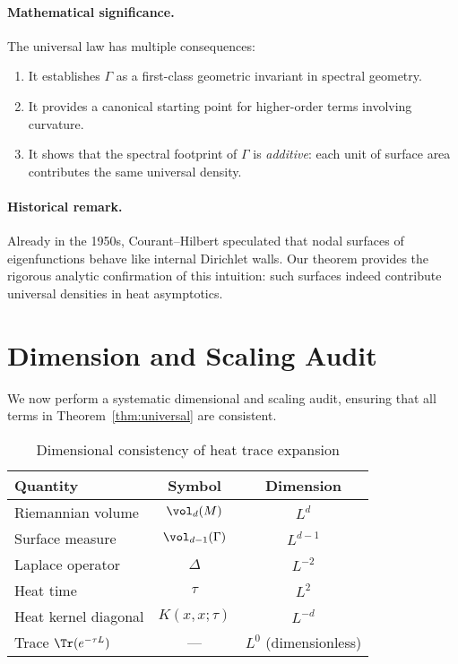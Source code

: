 \paragraph{Mathematical significance.}
The universal law has multiple consequences:
\begin{enumerate}
  \item It establishes $\Gamma$ as a first-class geometric invariant in spectral geometry.
  \item It provides a canonical starting point for higher-order terms involving curvature.
  \item It shows that the spectral footprint of $\Gamma$ is \emph{additive}: each unit of surface area contributes the same universal density.
\end{enumerate}

\paragraph{Historical remark.}
Already in the 1950s, Courant--Hilbert speculated that nodal surfaces of eigenfunctions behave like internal Dirichlet walls.
Our theorem provides the rigorous analytic confirmation of this intuition: such surfaces indeed contribute universal densities in heat asymptotics.

\section{Dimension and Scaling Audit}
\label{sec:dim-scaling}

We now perform a systematic dimensional and scaling audit, ensuring that all terms in Theorem~\ref{thm:universal} are consistent.

\begin{table}[h]
\centering
\begin{tabular}{l|c|c}
Quantity & Symbol & Dimension \\
\hline
Riemannian volume & $\vol_d(M)$ & $L^d$ \\
Surface measure & $\vol_{d-1}(\Gamma)$ & $L^{d-1}$ \\
Laplace operator & $\Delta$ & $L^{-2}$ \\
Heat time & $\tau$ & $L^2$ \\
Heat kernel diagonal & $K(x,x;\tau)$ & $L^{-d}$ \\
Trace $\Tr(e^{-\tau L})$ & --- & $L^0$ (dimensionless) \\
\end{tabular}
\caption{Dimensional consistency of heat trace expansion}
\end{table}

